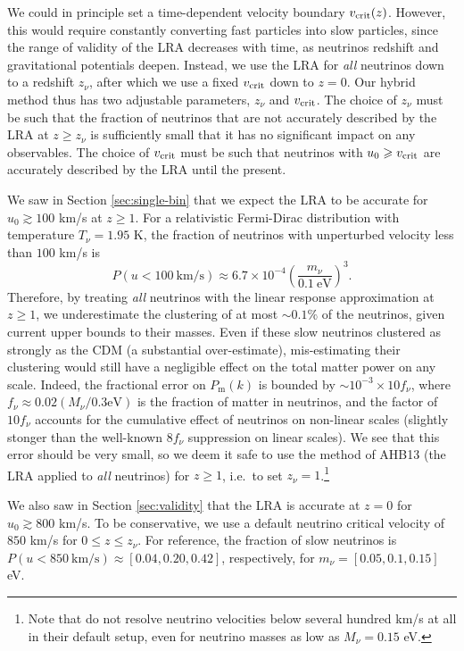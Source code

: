 \documentclass[useAMS, usenatbib]{mnras}
\newcommand{\beq}{\begin{equation}}
\newcommand{\eeq}{\end{equation}}
\begin{document}
We could in principle set a time-dependent velocity boundary $v_{\rm crit}(z)$. However, this would require constantly converting fast particles into slow particles, since the range of validity of the LRA decreases with time, as neutrinos redshift and gravitational potentials deepen. Instead, we use the LRA for \emph{all} neutrinos down to a redshift $z_\nu$, after which we use a fixed $v_{\rm crit}$ down to $z = 0$. Our hybrid method thus has two adjustable parameters, $z_\nu$ and $v_{\rm crit}$. The choice of $z_\nu$ must be such that the fraction of neutrinos that are not accurately described by the LRA at $z \geq z_\nu$ is sufficiently small that it has no significant impact on any observables. The choice of $v_{\rm crit}$ must be such that neutrinos with $u_0 \geq v_{\rm crit}$ are accurately described by the LRA until the present.

We saw in Section \ref{sec:single-bin} that we expect the LRA to be accurate for $u_0 \gtrsim 100$ km/s at $z \geq 1$. For a relativistic Fermi-Dirac distribution with temperature $T_\nu = 1.95$ K, the fraction of neutrinos with unperturbed velocity less than $100$ km/s is
\beq
P(u < 100 ~\textrm{km/s}) \approx 6.7 \times 10^{-4} \left(\frac{m_{\nu}}{0.1~\textrm{eV}}\right)^3.
\eeq
Therefore, by treating \emph{all} neutrinos with the linear response approximation at $z \geq 1$, we underestimate the clustering of at most $\sim 0.1\%$ of the neutrinos, given current upper bounds to their masses.
Even if these slow neutrinos clustered as strongly as the CDM (a substantial over-estimate), mis-estimating their clustering would still have a negligible effect on the total matter power on any scale. Indeed, the fractional error on $P_\mathrm{m}(k)$ is bounded by $\sim 10^{-3} \times 10 f_{\nu}$, where $f_\nu \approx 0.02 (M_\nu/0.3 \textrm{eV})$ is the fraction of matter in neutrinos, and the factor of $10 f_\nu$ accounts for the cumulative effect of neutrinos on non-linear scales (slightly stonger than the well-known $8 f_\nu$ suppression on linear scales). We see that this error should be very small, so we deem it safe to use the method of AHB13 (the LRA applied to \emph{all} neutrinos) for $z \geq 1$, i.e.~to set $z_\nu = 1$.\footnote{Note that \cite{Banerjee_2018} do not resolve neutrino velocities below several hundred km/s at all in their default setup, even for neutrino masses as low as $M_\nu = 0.15$ eV.}

We also saw in Section \ref{sec:validity} that the LRA is accurate at $z = 0$ for $u_0 \gtrsim 800$ km/s. To be conservative, we use a default neutrino critical velocity of $850$ km/s for $0 \leq z \leq z_\nu$. For reference, the fraction of slow neutrinos is $P(u < 850 ~\textrm{km/s}) \approx [0.04, 0.20, 0.42]$, respectively, for  $m_{\nu} = [0.05, 0.1, 0.15]$ eV.
\end{document}
